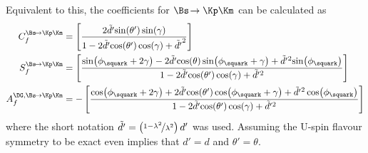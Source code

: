 Equivalent to this, the \CP coefficients for $\Bs\!\to\Kp\Km$ can be calculated as
\begin{equation}
\begin{aligned}
C_{f}^{\Bs\!\to\Kp\Km}&=\left[\frac{2\tilde{d'}\!\sin\!\left(\theta'\right)\sin\!\left(\gamma\right)}{1-2\tilde{d'}\!\cos\!\left(\theta'\right)\cos\!\left(\gamma\right)+\tilde{d'}^2}\right]\\
S_{f}^{\Bs\!\to\Kp\Km}&=\left[\frac{\sin\!\left(\phi_\squark+2\gamma\right)-2\tilde{d'}\!\cos\!\left(\theta\right)\sin\!\left(\phi_\squark+\gamma\right)+\tilde{d'}{}^2\!\sin\!\left(\phi_\squark\right)}{1-2\tilde{d'}\!\cos\!\left(\theta'\right)\cos\!\left(\gamma\right)+\tilde{d'}{}^2}\right]\\
A_f^{\DG, \Bs\!\to\Kp\Km}&=-\left[\frac{\cos\!\left(\phi_\squark+2\gamma\right)+2\tilde{d'}\!\cos\!\left(\theta'\right)\cos\!\left(\phi_\squark+\gamma\right)+\tilde{d'}{}^2\cos\!\left(\phi_\squark\right)}{1-2\tilde{d'}\!\cos\!\left(\theta'\right)\cos\!\left(\gamma\right)+\tilde{d'}{}^2}\right]
\end{aligned}
\end{equation}
where the short notation $\tilde{d'}=\left(\nicefrac{1-\lambda^2}{\lambda^2}\right)d'$ was used.
Assuming the U-spin flavour symmetry to be exact even implies that $d'=d$ and $\theta'=\theta$.

